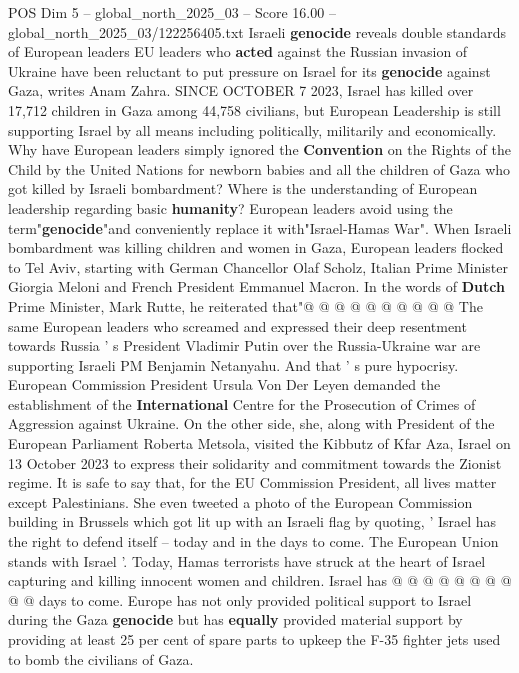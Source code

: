 \begin{textsample}{POS Dim 5 – global\_north\_2025\_03 – Score 16.00 – global\_north\_2025\_03/122256405.txt}  \label{ex:f5_pos_159}
Israeli \textbf{genocide} reveals double standards of European leaders EU leaders who \textbf{acted} against the Russian invasion of Ukraine have been reluctant to put pressure on Israel for its \textbf{genocide} against Gaza, writes Anam Zahra.
SINCE OCTOBER 7 2023, Israel has killed over 17,712 children in Gaza among 44,758 civilians, but European Leadership is still supporting Israel by all means including politically, militarily and economically.
Why have European leaders simply ignored the \textbf{Convention} on the Rights of the Child by the United Nations for newborn babies and all the children of Gaza who got killed by Israeli bombardment?
Where is the understanding of European leadership regarding basic \textbf{humanity}?
European leaders avoid using the term"\textbf{genocide}"and conveniently replace it with"Israel-Hamas War".
When Israeli bombardment was killing children and women in Gaza, European leaders flocked to Tel Aviv, starting with German Chancellor Olaf Scholz, Italian Prime Minister Giorgia Meloni and French President Emmanuel Macron.
In the words of \textbf{Dutch} Prime Minister, Mark Rutte, he reiterated that"@ @ @ @ @ @ @ @ @ @ The same European leaders who screamed and expressed their deep resentment towards Russia ' s President Vladimir Putin over the Russia-Ukraine war are supporting Israeli PM Benjamin Netanyahu.
And that ' s pure hypocrisy.
European Commission President Ursula Von Der Leyen demanded the establishment of the \textbf{International} Centre for the Prosecution of Crimes of Aggression against Ukraine.
On the other side, she, along with President of the European Parliament Roberta Metsola, visited the Kibbutz of Kfar Aza, Israel on 13 October 2023 to express their solidarity and commitment towards the Zionist regime.
It is safe to say that, for the EU Commission President, all lives matter except Palestinians.
She even tweeted a photo of the European Commission building in Brussels which got lit up with an Israeli flag by quoting, ' Israel has the right to defend itself -- today and in the days to come.
The European Union stands with Israel '.
Today, Hamas terrorists have struck at the heart of Israel capturing and killing innocent women and children.
Israel has @ @ @ @ @ @ @ @ @ @ days to come.
Europe has not only provided political support to Israel during the Gaza \textbf{genocide} but has \textbf{equally} provided material support by providing at least 25 per cent of spare parts to upkeep the F-35 fighter jets used to bomb the civilians of Gaza.

\end{textsample}

